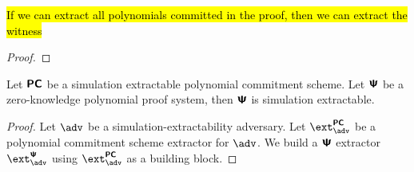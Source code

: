 \documentclass[runningheads,11pt]{llncs}
\begin{document}
\begin{lemma}
  \hl{If we can extract all polynomials committed in the proof, then we can
    extract the witness}
\end{lemma}
\begin{proof}
  
\end{proof}

\begin{corollary}
  Let $\bm{\mathsf{PC}}$ be a simulation extractable polynomial commitment scheme. Let
  $\bm{\mathsf{\Psi}}$ be a zero-knowledge polynomial proof system, then $\bm{\mathsf{\Psi}}$ is simulation extractable.
\end{corollary}
\begin{proof}
  Let $\adv$ be a simulation-extractability adversary. Let $\extpcom_\adv$ be a
  polynomial commitment scheme extractor for $\adv$. We build a $\bm{\mathsf{\Psi}}$ extractor
  $\extps_\adv$ using $\extpcom_\adv$ as a building block.
\end{proof}
\end{document}
